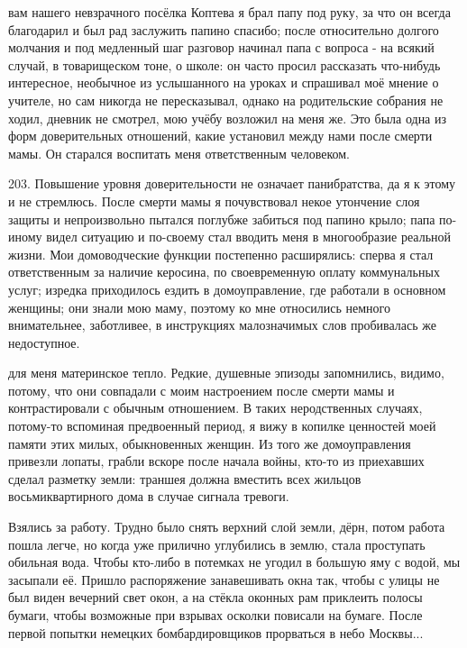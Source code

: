\label{202-1}
вам нашего невзрачного посёлка Коптева я брал папу под руку, за что он всегда благодарил и был рад заслужить папино спасибо; после относительно долгого молчания и под медленный шаг разговор начинал папа с вопроса - на всякий случай, в товарищеском тоне, о школе: он часто просил рассказать что-нибудь интересное, необычное из услышанного на уроках и спрашивал моё мнение о учителе, но сам никогда не пересказывал, однако на родительские собрания не ходил, дневник не смотрел, мою учёбу возложил на меня же. Это была одна из форм доверительных отношений, какие установил между нами после смерти мамы. Он старался воспитать меня ответственным человеком.

\label{203-1}
203. Повышение уровня доверительности не означает панибратства, да я к этому и не стремлюсь. После смерти мамы я почувствовал некое утончение слоя защиты и непроизвольно пытался поглубже забиться под папино крыло; папа по-иному видел ситуацию и по-своему стал вводить меня в многообразие реальной жизни. Мои домоводческие функции постепенно расширялись: сперва я стал ответственным за наличие керосина, по своевременную оплату коммунальных услуг; изредка приходилось ездить в домоуправление, где работали в основном женщины; они знали мою маму, поэтому ко мне относились немного внимательнее, заботливее, в инструкциях малозначимых слов пробивалась же недоступное.

\label{204-1}
для меня материнское тепло. Редкие, душевные эпизоды запомнились, видимо, потому, что они совпадали с моим настроением после смерти мамы и контрастировали с обычным отношением. В таких неродственных случаях, потому-то вспоминая предвоенный период, я вижу в копилке ценностей моей памяти этих милых, обыкновенных женщин. Из того же домоуправления привезли лопаты, грабли вскоре после начала войны, кто-то из приехавших сделал разметку земли: траншея должна вместить всех жильцов восьмиквартирного дома в случае сигнала тревоги.

\label{205-1}
Взялись за работу. Трудно было снять верхний слой земли, дёрн, потом работа пошла легче, но когда уже прилично углубились в землю, стала проступать обильная вода. Чтобы кто-либо в потемках не угодил в большую яму с водой, мы засыпали её. Пришло распоряжение занавешивать окна так, чтобы с улицы не был виден вечерний свет окон, а на стёкла оконных рам приклеить полосы бумаги, чтобы возможные при взрывах осколки повисали на бумаге. После первой попытки немецких бомбардировщиков прорваться в небо Москвы...

